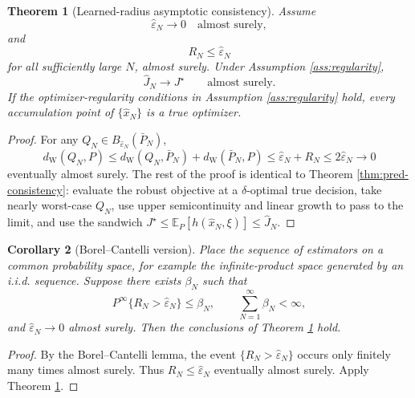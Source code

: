 \documentclass[11pt]{article}
\newtheorem{theorem}{Theorem}[section]
\newtheorem{corollary}[theorem]{Corollary}
\newcommand{\E}{\mathbb{E}}
\newcommand{\1}{\mathbf{1}}
\newcommand{\dW}{d_{\mathrm W}}
\newcommand{\Pbar}{\bar P_N}
\newcommand{\epshat}{\widehat\varepsilon_N}
\begin{document}
\begin{theorem}[Learned-radius asymptotic consistency]\label{thm:learned-radius-consistency}
Assume
\begin{equation}
    \epshat\to0\quad\text{almost surely},
\end{equation}
and
\begin{equation}
    R_N\le\epshat
\end{equation}
for all sufficiently large $N$, almost surely. Under Assumption \ref{ass:regularity},
\begin{equation}
    \widehat J_N\to J^\star
    \qquad\text{almost surely.}
\end{equation}
If the optimizer-regularity conditions in Assumption \ref{ass:regularity} hold, every accumulation point of $\{\widehat x_N\}$ is a true optimizer.
\end{theorem}

\begin{proof}
For any $Q_N\in B_{\epshat}(\Pbar)$,
\begin{equation}
    \dW(Q_N,P)\le\dW(Q_N,\Pbar)+\dW(\Pbar,P)
    \le\epshat+R_N\le2\epshat\to0
\end{equation}
eventually almost surely. The rest of the proof is identical to Theorem \ref{thm:pred-consistency}: evaluate the robust objective at a $\delta$-optimal true decision, take nearly worst-case $Q_N$, use upper semicontinuity and linear growth to pass to the limit, and use the sandwich $J^\star\le\E_P[h(\widehat x_N,\xi)]\le\widehat J_N$.
\end{proof}

\begin{corollary}[Borel--Cantelli version]\label{cor:bc}
Place the sequence of estimators on a common probability space, for example the infinite-product space generated by an i.i.d. sequence. Suppose there exists $\beta_N$ such that
\begin{equation}
    P^\infty\{R_N>\epshat\}\le\beta_N,
    \qquad
    \sum_{N=1}^\infty\beta_N<\infty,
\end{equation}
and $\epshat\to0$ almost surely. Then the conclusions of Theorem \ref{thm:learned-radius-consistency} hold.
\end{corollary}

\begin{proof}
By the Borel--Cantelli lemma, the event $\{R_N>\epshat\}$ occurs only finitely many times almost surely. Thus $R_N\le\epshat$ eventually almost surely. Apply Theorem \ref{thm:learned-radius-consistency}.
\end{proof}
\end{document}
